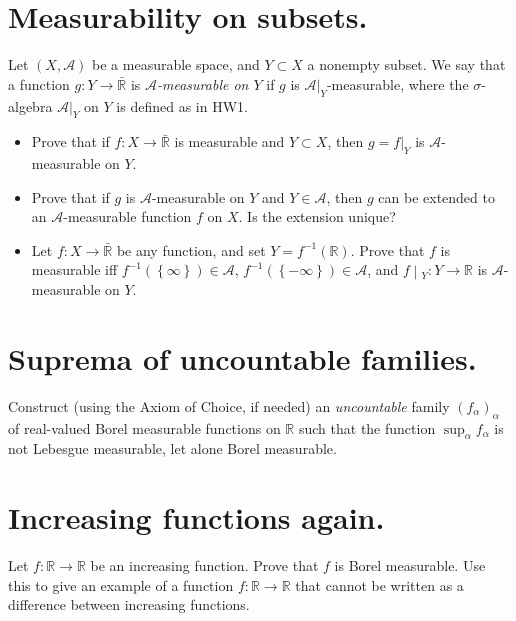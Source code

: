 \documentclass{qlnotes-export}
\begin{document}
\section{Measurability on subsets.}

Let \((X,\mathcal{A})\) be a measurable space, and \(Y \subset X\) a nonempty subset. We say that a function \(g:Y\rightarrow\bar{\mathbb{R}}\) is \emph{\(\mathcal{A}\)-measurable on \(Y\)} if \(g\) is \(\mathcal{A}|_{Y}\)-measurable, where the \(\sigma\)-algebra \(\mathcal{A}|_{Y}\) on \(Y\) is defined as in HW1.

\begin{itemize}
\item
  Prove that if \(f:X\rightarrow\bar{\mathbb{R}}\) is measurable and \(Y \subset X\), then \(g = f|_{Y}\) is \(\mathcal{A}\)-measurable on \(Y\).
\item
  Prove that if \(g\) is \(\mathcal{A}\)-measurable on \(Y\) and \(Y \in \mathcal{A}\), then \(g\) can be extended to an \(\mathcal{A}\)-measurable function \(f\) on \(X\). Is the extension unique?
\item
  Let \(f:X\rightarrow\bar{\mathbb{R}}\) be any function, and set \(Y = f^{- 1}({\mathbb{R}})\). Prove that \(f\) is measurable iff \(f^{- 1}(\left\{ \infty \right\}) \in \mathcal{A}\), \(f^{- 1}(\left\{ {- \infty} \right\}) \in \mathcal{A}\), and \(\left. f \middle| {}_{Y}:Y\rightarrow{\mathbb{R}} \right.\) is \(\mathcal{A}\)-measurable on \(Y\).
\end{itemize}

\section{Suprema of uncountable families.}

Construct (using the Axiom of Choice, if needed) an \emph{uncountable} family \((f_{\alpha})_{\alpha}\) of real-valued Borel measurable functions on \(\mathbb{R}\) such that the function \(\sup_{\alpha}f_{\alpha}\) is not Lebesgue measurable, let alone Borel measurable.

\section{Increasing functions again.}

Let \(f:{\mathbb{R}}\rightarrow{\mathbb{R}}\) be an increasing function. Prove that \(f\) is Borel measurable. Use this to give an example of a function \(f:{\mathbb{R}}\rightarrow{\mathbb{R}}\) that cannot be written as a difference between increasing functions.
\end{document}
